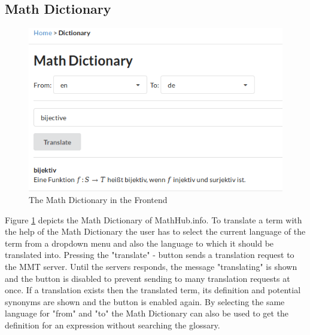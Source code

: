 \documentclass[11pt,a4paper]{article}
\begin{document}
\subsection{Math Dictionary}
\begin{figure}[H]
\includegraphics[width=1\textwidth]{dictionary.png}
\caption{The Math Dictionary in the Frontend}
\label{fig:dict}
\end{figure}
Figure \ref{fig:dict} depicts the Math Dictionary of MathHub.info.
To translate a term with the help of the Math Dictionary the user has to select the current language of the term from a dropdown menu and also the language to which it should be translated into.
Pressing the "translate" - button sends a translation request to the MMT server.
Until the servers responds, the message "translating" is shown and the button is disabled to prevent sending to many translation requests at once.
If a translation exists then the translated term, its definition and potential synonyms are shown and the button is enabled again.
By selecting the same language for "from" and "to" the Math Dictionary can also be used to get the definition for an expression without searching the glossary.
\end{document}
